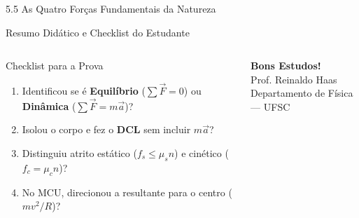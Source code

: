 \documentclass[10pt,aspectratio=169]{beamer}
\begin{document}
\begin{frame}{5.5 As Quatro Forças Fundamentais da Natureza}
    \begin{center}
    \end{center}
\end{frame}

\begin{frame}{Resumo Didático e Checklist do Estudante}
    \begin{columns}[T]
        \begin{block}{Checklist para a Prova}
            \small
            \begin{enumerate}\setlength{\itemsep}{2pt}
                \item Identificou se é \textbf{Equilíbrio} ($\sum\vec{F}=0$) ou \textbf{Dinâmica} ($\sum\vec{F}=m\vec{a}$)?
                \item Isolou o corpo e fez o \textbf{DCL} sem incluir $m\vec{a}$?
                \item Distinguiu atrito estático ($f_s \le \mu_s n$) e cinético ($f_c = \mu_c n$)?
                \item No MCU, direcionou a resultante para o centro ($m v^2/R$)?
            \end{enumerate}
        \end{block}

        \begin{center}
        \vspace{10pt}
        \Large \textbf{Bons Estudos!}\\[12pt]
        \normalsize Prof. Reinaldo Haas\\[4pt]
        \small Departamento de Física --- UFSC
        \end{center}
    \end{columns}
\end{frame}
\end{document}
